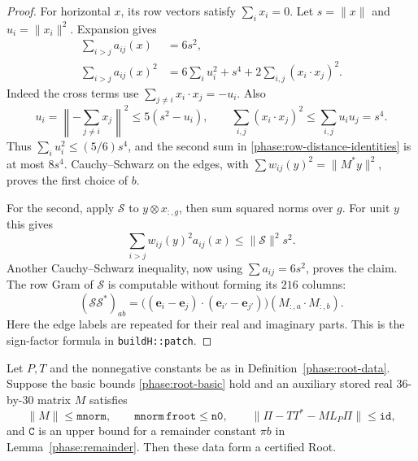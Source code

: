 \begin{proof}
For horizontal \(x\), its row vectors satisfy \(\sum_i x_i=0\).
Let \(s=\|x\|\) and \(u_i=\|x_i\|^2\).  Expansion gives
\begin{align}
 \sum_{i>j}a_{ij}(x)&=6s^2,\nonumber\\
 \sum_{i>j}a_{ij}(x)^2
   &=6\sum_i u_i^2+s^4+2\sum_{i,j}(x_i\cdot x_j)^2.
 \label{phase:row-distance-identities}
\end{align}
Indeed the cross terms use
\(\sum_{j\ne i}x_i\cdot x_j=-u_i\).  Also
\[
 u_i=\left\|-\sum_{j\ne i}x_j\right\|^2
 \leq5(s^2-u_i),\qquad
 \sum_{i,j}(x_i\cdot x_j)^2\leq\sum_{i,j}u_i u_j=s^4.
\]
Thus \(\sum_i u_i^2\leq(5/6)s^4\), and the second sum in
\eqref{phase:row-distance-identities} is at most \(8s^4\).
Cauchy--Schwarz on the edges, with
\(\sum w_{ij}(y)^2=\|M^*y\|^2\), proves the first choice of \(b\).

For the second, apply \(\mathcal S\) to
\(y\otimes x_{:,g}\), then sum squared norms over \(g\).  For unit \(y\)
this gives
\[
 \sum_{i>j}w_{ij}(y)^2a_{ij}(x)
 \leq\|\mathcal S\|^2s^2.
\]
Another Cauchy--Schwarz inequality, now using
\(\sum a_{ij}=6s^2\), proves the claim.  The row Gram of \(\mathcal S\)
is computable without forming its \(216\) columns:
\begin{equation}
 (\mathcal S\mathcal S^*)_{ab}
  =\bigl((\mathbf e_i-\mathbf e_j)\cdot
                (\mathbf e_{i'}-\mathbf e_{j'})\bigr)
           (M_{:,a}\cdot M_{:,b}).
 \label{phase:tensor-gram}
\end{equation}
Here the edge labels are repeated for their real and imaginary parts.
This is the sign-factor formula in \texttt{buildH::patch}.
\end{proof}

\begin{proposition}
\label{phase:root-bounds}
Let \(P,T\) and the nonnegative constants be as in
Definition~\ref{phase:root-data}.  Suppose the basic bounds
\eqref{phase:root-basic} hold and an auxiliary stored real
\(36\)-by-\(30\) matrix \(M\) satisfies
\begin{equation}
 \|M\|\leq\mathtt{mnorm},\qquad
 \mathtt{mnorm}\,\mathtt{froot}\leq\mathtt{n0},\qquad
 \|\Pi-TT^*-ML_P\Pi\|\leq\mathtt{id},
 \label{phase:projector-certificate}
\end{equation}
and \(\mathtt C\) is an upper bound for a remainder constant
\(\pi b\) in Lemma~\ref{phase:remainder}.  Then these data form a
certified Root.
\end{proposition}

